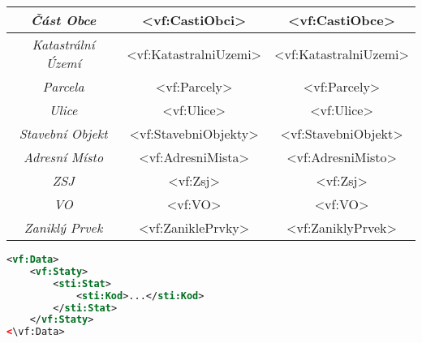 \begin{table}[!h]
\begin{tabular}{|c|c|c|}
    \textit{Část Obce}                   & \textless{}vf:CastiObci\textgreater{}          & \textless{}vf:CastiObce\textgreater{}         \\ \hline
    \textit{Katastrální Území}           & \textless{}vf:KatastralniUzemi\textgreater{}   & \textless{}vf:KatastralniUzemi\textgreater{}  \\ \hline
    \textit{Parcela}                     & \textless{}vf:Parcely\textgreater{}            & \textless{}vf:Parcely\textgreater{}           \\ \hline
    \textit{Ulice}                       & \textless{}vf:Ulice\textgreater{}              & \textless{}vf:Ulice\textgreater{}             \\ \hline
    \textit{Stavební Objekt}             & \textless{}vf:StavebniObjekty\textgreater{}    & \textless{}vf:StavebniObjekt\textgreater{}    \\ \hline
    \textit{Adresní Místo}               & \textless{}vf:AdresniMista\textgreater{}       & \textless{}vf:AdresniMisto\textgreater{}      \\ \hline
    \textit{ZSJ}                         & \textless{}vf:Zsj\textgreater{}                & \textless{}vf:Zsj\textgreater{}               \\ \hline
    \textit{VO}                          & \textless{}vf:VO\textgreater{}                 & \textless{}vf:VO\textgreater{}                \\ \hline
    \textit{Zaniklý Prvek}               & \textless{}vf:ZaniklePrvky\textgreater{}       & \textless{}vf:ZaniklyPrvek\textgreater{}      \\ \hline
    \end{tabular}
\end{table}

\small
\begin{lstlisting}[language=xml, caption={Příklad XML Struktury}, label=lst:vfStruktura]
<vf:Data>
    <vf:Staty>
        <sti:Stat>
            <sti:Kod>...</sti:Kod>
        </sti:Stat>
    </vf:Staty>
<\vf:Data>
\end{lstlisting}
\normalsize

